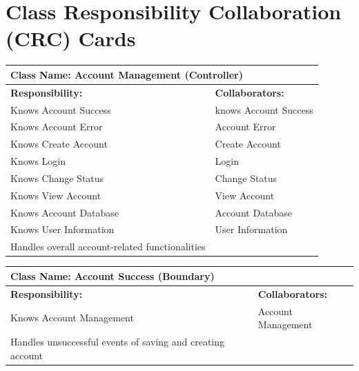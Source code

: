 \documentclass[]{article}
\begin{document}

	
\section{Class Responsibility Collaboration (CRC) Cards}
\label{sec:class_responsibility_collaboration_crc_cards}

	\begin{table}[ht]
		\centering
		\begin{tabular}{|p{7cm}|p{7cm}|}
		\hline 
		 \multicolumn{2}{|l|}{\textbf{Class Name:} Account Management (Controller)} \\
		\hline
		\textbf{Responsibility:} & \textbf{Collaborators:} \\
		\hline
		Knows Account Success & knows Account Success\\
		Knows Account Error & Account Error \\
		Knows Create Account & Create Account\\
		Knows Login & Login\\
		Knows Change Status & Change Status\\
		Knows View Account & View Account\\
		Knows Account Database & Account Database\\
		Knows User Information &User Information\\
		Handles overall account-related functionalities
		\vspace{0.1in} & \\
		\hline
		\end{tabular}
	\end{table}

	\begin{table}[ht]
		\centering
		\begin{tabular}{|p{7cm}|p{7cm}|}
		\hline 
		 \multicolumn{2}{|l|}{\textbf{Class Name:} Account Success (Boundary)} \\
		\hline
		\textbf{Responsibility:} & \textbf{Collaborators:} \\
		\hline
		Knows Account Management & Account Management\\
		Handles unsuccessful events of saving and creating account
		\vspace{0.1in} & \\
		\hline
		\end{tabular}
	\end{table}
\end{document}

